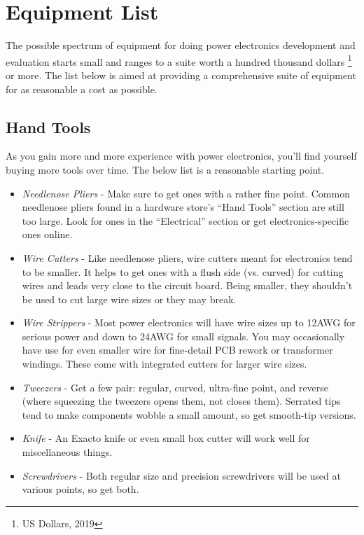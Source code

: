 \section{Equipment List}

The possible spectrum of equipment for doing power electronics development and evaluation starts small and ranges to a suite worth a hundred thousand dollars \footnote{US Dollars, 2019} or more. The list below is aimed at providing a comprehensive suite of equipment for as reasonable a cost as possible.


\subsection{Hand Tools} %

As you gain more and more experience with power electronics, you'll find yourself buying more tools over time. The below list is a reasonable starting point.

\begin{itemize}
\item \emph{Needlenose Pliers} - Make sure to get ones with a rather fine point. Common needlenose pliers found in a hardware store's ``Hand Tools'' section are still too large. Look for ones in the ``Electrical'' section or get electronics-specific ones online.
\item \emph{Wire Cutters} - Like needlenose pliers, wire cutters meant for electronics tend to be smaller. It helps to get ones with a flush side (vs. curved) for cutting wires and leads very close to the circuit board. Being smaller, they shouldn't be used to cut large wire sizes or they may break.
\item \emph{Wire Strippers} - Most power electronics will have wire sizes up to 12AWG for serious power and down to 24AWG for small signals. You may occasionally have use for even smaller wire for fine-detail PCB rework or transformer windings. These come with integrated cutters for larger wire sizes.
\item \emph{Tweezers} - Get a few pair: regular, curved, ultra-fine point, and reverse (where squeezing the tweezers opens them, not closes them). Serrated tips tend to make components wobble a small amount, so get smooth-tip versions.
\item \emph{Knife} - An Exacto knife or even small box cutter will work well for miscellaneous things.
\item \emph{Screwdrivers} - Both regular size and precision screwdrivers will be used at various points, so get both.

\end{itemize}

